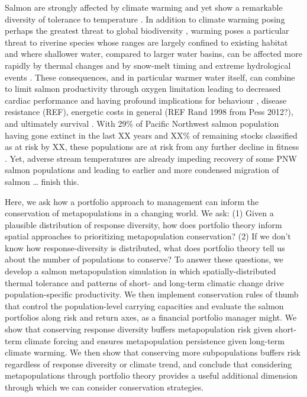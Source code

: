 Salmon are strongly affected by climate warming and yet show a remarkable diversity of tolerance to temperature \citep{beacham1989, crozier2006, battin2007, crozier2008}. In addition to climate warming posing perhaps the greatest threat to global biodiversity \citep{thomas2004}, warming poses a particular threat to riverine species whose ranges are largely confined to existing habitat \citep{thomas2010} and where shallower water, compared to larger water basins, can be affected more rapidly by thermal changes \citep{isaak2010} and by snow-melt timing and extreme hydrological events \citep{crozier2008}. These consequences, and in particular warmer water itself, can combine to limit salmon productivity through oxygen limitation \citep{portner2007} leading to decreased cardiac performance \citep{eliason2011} and having profound implications for behaviour \citep{goniea2006}, disease resistance (REF), energetic costs in general (REF Rand 1998 from Pess 2012?), and ultimately survival \citep{peterman1998, eliason2011}. With 29\% of Pacific Northwest salmon population having gone extinct in the last XX years and XX\% of remaining stocks classified as at risk by XX, these populations are at risk from any further decline in fitness \citep{crozier2008, mcclure2003}. Yet, adverse stream temperatures are already impeding recovery of some PNW salmon populations \citep{mccullough1999} and leading to earlier and more condensed migration of salmon \citep{kovach2013a}\ldots{} finish this.

Here, we ask how a portfolio approach to management can inform the conservation of metapopulations in a changing world. We ask: (1) Given a plausible distribution of response diversity, how does portfolio theory inform spatial approaches to prioritizing metapopulation conservation? (2) If we don't know how response-diversity is distributed, what does portfolio theory tell us about the number of populations to conserve? To answer these questions, we develop a salmon metapopulation simulation in which spatially-distributed thermal tolerance and patterns of short- and long-term climatic change drive population-specific productivity. We then implement conservation rules of thumb that control the population-level carrying capacities and evaluate the salmon portfolios along risk and return axes, as a financial portfolio manager might. We show that conserving response diversity buffers metapopulation risk given short-term climate forcing and ensures metapopulation persistence given long-term climate warming. We then show that conserving more subpopulations buffers risk regardless of response diversity or climate trend, and conclude that considering metapopulations through portfolio theory provides a useful additional dimension through which we can consider conservation strategies.

